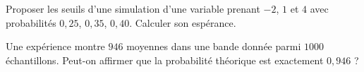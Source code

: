 \documentclass[11pt,a4paper]{article}
\begin{document}
\par\noindent\begin{minipage}{\linewidth}
Proposer les seuils d’une simulation d’une variable prenant $-2$, $1$ et $4$ avec probabilités $0,25$, $0,35$, $0,40$. Calculer son espérance.
\end{minipage}\par
\par\noindent\begin{minipage}{\linewidth}
Une expérience montre $946$ moyennes dans une bande donnée parmi $1000$ échantillons. Peut-on affirmer que la probabilité théorique est exactement $0,946$ ?
\end{minipage}\par
\end{document}
